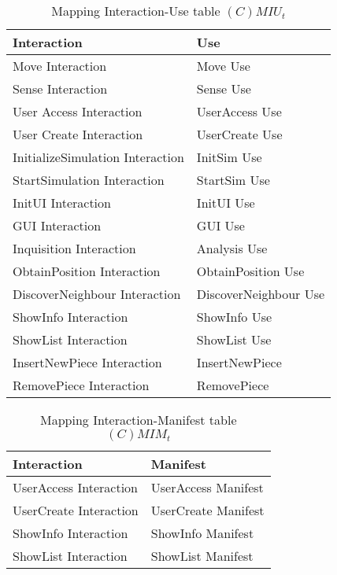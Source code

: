 \begin{table}[H]
	\centering
	\begin{tabular}{|p{4cm}|p{8cm}|}
			\hline
			\textbf{Interaction} & \textbf{Use} \\
			\hline
			Move Interaction & Move Use \\
			\hline
			Sense Interaction & Sense Use \\
			\hline
			User Access Interaction & UserAccess Use \\
			\hline
			User Create Interaction & UserCreate Use \\
			\hline
			InitializeSimulation Interaction & InitSim Use \\
			\hline
			StartSimulation Interaction & StartSim Use \\
			\hline
			InitUI Interaction & InitUI Use \\
			\hline
			GUI Interaction & GUI Use \\
			\hline
			Inquisition Interaction & Analysis Use \\
			\hline
			ObtainPosition Interaction & ObtainPosition Use \\	
			\hline
			DiscoverNeighbour Interaction & DiscoverNeighbour Use \\	
			\hline
			ShowInfo Interaction & ShowInfo Use \\
			\hline
			ShowList Interaction & ShowList Use \\
			\hline
			InsertNewPiece Interaction & InsertNewPiece \\
			\hline
			RemovePiece Interaction & RemovePiece \\
			\hline
		\end{tabular}
	\caption{Mapping Interaction-Use table $(C)MIU_t$}
	\label{tab:cmiut}
\end{table}

\begin{table}[H]
	\centering
	\begin{tabular}{|p{4cm}|p{8cm}|}
			\hline
			\textbf{Interaction} & \textbf{Manifest} \\
			\hline
			UserAccess Interaction & UserAccess Manifest \\
			\hline
			UserCreate Interaction & UserCreate Manifest \\
			\hline
			ShowInfo Interaction & ShowInfo Manifest \\
			\hline
			ShowList Interaction & ShowList Manifest \\
			\hline
		\end{tabular}
	\caption{Mapping Interaction-Manifest table $(C)MIM_t$}
	\label{tab:cmimt}
\end{table}

